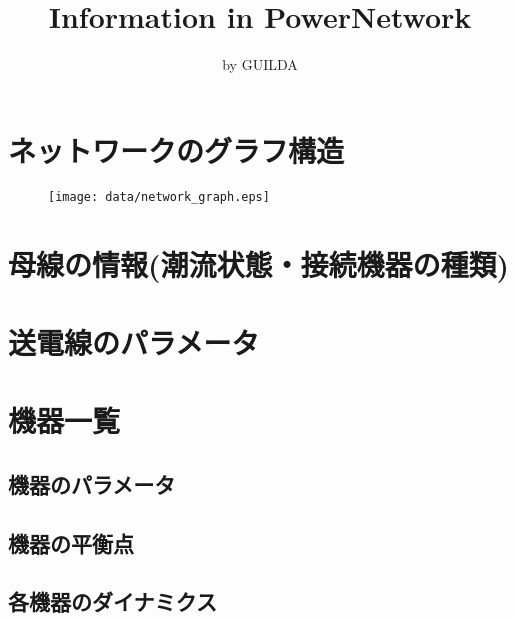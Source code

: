 \documentclass[landscape]{report}
\title{Information in PowerNetwork}
\author{by GUILDA}
\begin{document}
\maketitle{}
\section{ネットワークのグラフ構造}

 \begin{figure}[h]
 \begin{center}
 \texttt{[image: data/network\_graph.eps]}
 \end{center}
 \end{figure}
 \newpage

\section{母線の情報(潮流状態・接続機器の種類)}


\section{送電線のパラメータ}


\section{機器一覧}
\subsection{機器のパラメータ}


\subsection{機器の平衡点}


\subsection{各機器のダイナミクス}

\end{document}
